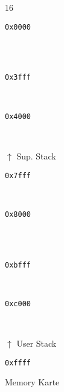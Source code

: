 \documentclass{scrartcl}
\begin{document}
\begin{figure}[h]
	\centering
	\caption{Memory Karte}
	\label{fig:memoryMap}
	\begin{bytefield}[leftcurly=., rightcurly=., leftcurlyspace=0pt, rightcurlyspace=0pt]{16}
		
		\begin{leftwordgroup}{\small \texttt{0x0000}}
		\end{leftwordgroup}\\
		 \\
		\begin{leftwordgroup}{\small \texttt{0x3fff}}
		\end{leftwordgroup}\\

		\begin{leftwordgroup}{\small \texttt{0x4000}}
		\end{leftwordgroup}\\
		\begin{rightwordgroup}{\large $\uparrow$ Sup. Stack}
			 \\
		\end{rightwordgroup}
		\begin{leftwordgroup}{\small \texttt{0x7fff}}
		\end{leftwordgroup}\\

		\begin{leftwordgroup}{\small \texttt{0x8000}}
		\end{leftwordgroup}\\
			 \\
		\begin{leftwordgroup}{\small \texttt{0xbfff}}
		\end{leftwordgroup}\\

		\begin{leftwordgroup}{\small \texttt{0xc000}}
		\end{leftwordgroup}\\
		\begin{rightwordgroup}{\large $\uparrow$ User Stack}
			 \\
		\end{rightwordgroup}
		\begin{leftwordgroup}{\small \texttt{0xffff}}
		\end{leftwordgroup}

	\end{bytefield}
	
\end{figure}
\end{document}
